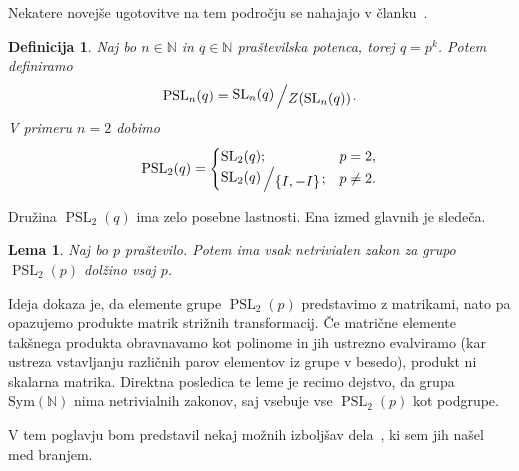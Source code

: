 \documentclass[12pt,a4paper]{article}
\newcounter{theoremcounter}[section] %
\newtheorem{lema}[theoremcounter]{Lema}
\newtheorem{definicija}[theoremcounter]{Definicija}
\newcommand{\quot}[2]{{\raisebox{0.1em}{$#1$}\left/\raisebox{-0.2em}{$#2$}\right.}}
\begin{document}
\noindent
Nekatere novejše ugotovitve na tem področju se nahajajo v članku~\cite{Bradford_Jakob_Schneider_Thom_2023}.
\begin{definicija}
Naj bo $n \in \mathbb{N}$ in $q \in \mathbb{N}$ praštevilska potenca, torej $q = p^{k}$. Potem definiramo \begin{equation*}
    \operatorname{PSL}_n(q) = \quot{\operatorname{SL}_n(q)}{Z(\operatorname{SL}_n(q))}.
 \end{equation*}   
V primeru $n = 2$ dobimo
\begin{equation*}
            \operatorname{PSL}_2(q) = \begin{cases}
                \operatorname{SL}_2(q); & p = 2,  \\
                \quot{\operatorname{SL}_2(q)}{\left\{ I, -I \right\} }; & p \neq 2.
            \end{cases}
         \end{equation*}   
\end{definicija}
\noindent
Družina $\operatorname{PSL}_2(q)$ ima zelo posebne lastnosti. Ena izmed glavnih je sledeča. 
\begin{lema}
Naj bo $p$ praštevilo. Potem ima vsak netrivialen zakon za grupo $\operatorname{PSL}_2(p)$ dolžino vsaj $p$.
\end{lema}
\noindent
Ideja dokaza je, da elemente grupe $\operatorname{PSL}_2(p)$ predstavimo z matrikami, nato pa opazujemo produkte matrik strižnih transformacij. Če matrične elemente takšnega produkta obravnavamo kot polinome in jih ustrezno evalviramo (kar ustreza vstavljanju različnih parov elementov iz grupe v besedo), produkt ni skalarna matrika. Direktna posledica te leme je recimo dejstvo, da grupa $\text{Sym}(\mathbb{N})$ nima
netrivialnih zakonov, saj vsebuje vse $\operatorname{PSL}_2(p)$ kot podgrupe.


\noindent
V tem poglavju bom predstavil nekaj možnih izboljšav dela~\cite{Schneider_2016}, ki sem jih našel med branjem.
\end{document}
